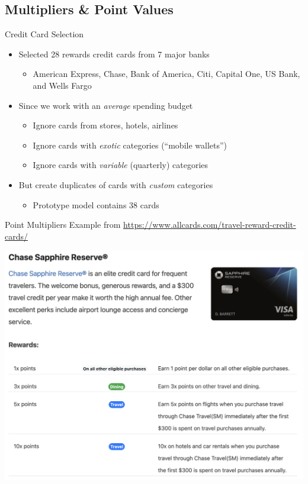 \subsection{Multipliers \& Point Values}

\begin{frame}{Credit Card Selection}
    \begin{itemize}
        \item Selected 28 rewards credit cards from 7 major banks
        \begin{itemize}
            \item American Express, Chase, Bank of America, Citi, Capital One, US Bank, and Wells Fargo
        \end{itemize}
        \smallskip

        \item Since we work with an \emph{average} spending budget
        \begin{itemize}
            \item Ignore cards from stores, hotels, airlines
            \item Ignore cards with \emph{exotic} categories (``mobile wallets'')
            \item Ignore cards with \emph{variable} (quarterly) categories
        \end{itemize}
        \smallskip
        \item But create duplicates of cards with \emph{custom} categories
        \begin{itemize}
            \item Prototype model contains 38 cards
        \end{itemize}
   \end{itemize}
\end{frame}

\begin{frame}{Point Multipliers}
    Example from \url{https://www.allcards.com/travel-reward-credit-cards/}
    \begin{center}
        \includegraphics[width=.8\textwidth]{../Misc/AllcardsExample.png}
    \end{center}
\end{frame}

